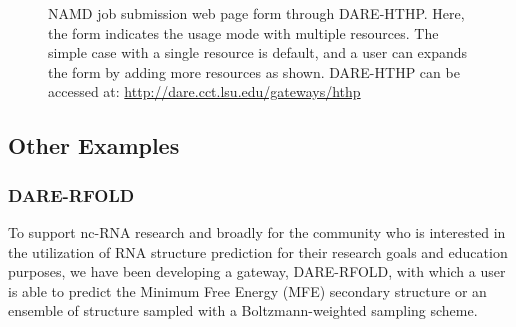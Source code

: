 \documentclass[]{article}
\begin{document}
\begin{figure}
 \centering
  \caption{\small {} NAMD job
    submission web page form through DARE-HTHP. Here, the form
    indicates the usage mode with multiple resources.  The simple case
    with a single resource is default, and a user can expands the form
    by adding more resources as shown.  DARE-HTHP can be accessed at:
    \url{http://dare.cct.lsu.edu/gateways/hthp} }
  \label{fig:NAMD2}
\end{figure}


\subsection{Other Examples}
\subsubsection{DARE-RFOLD}
To support nc-RNA research and broadly for the community who is
interested in the utilization of RNA structure prediction for their
research goals and education purposes, we have been developing a
gateway, DARE-RFOLD, with which a user is able to predict the Minimum
Free Energy (MFE) secondary structure or an ensemble of structure
sampled with a Boltzmann-weighted sampling scheme.
\end{document}

